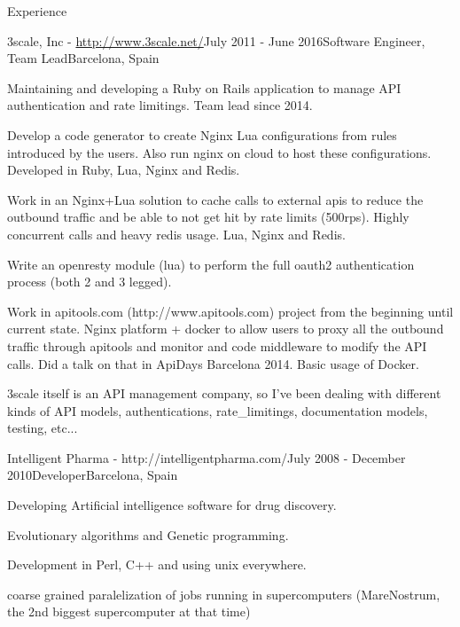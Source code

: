\documentclass{resume} %
\begin{document}
\begin{rSection}{Experience}
\begin{rSubsection}{3scale, Inc - \url{http://www.3scale.net/}}{July 2011 - June 2016}{Software Engineer, Team Lead}{Barcelona, Spain}
\item Maintaining and developing a Ruby on Rails application to manage
  API authentication and rate limitings. Team lead since 2014.
\item Develop a code generator to create Nginx Lua configurations from
  rules introduced by the users. Also run nginx on cloud to host these
  configurations. Developed in Ruby, Lua, Nginx and Redis.
\item Work in an Nginx+Lua solution to cache calls to external apis to
  reduce the outbound traffic and be able to not get hit by rate
  limits (500rps). Highly concurrent calls and heavy redis usage. Lua,
  Nginx and Redis.
\item Write an openresty module (lua) to perform the full oauth2
  authentication process (both 2 and 3 legged).
\item Work in apitools.com (http://www.apitools.com) project from the
  beginning until current state. Nginx platform + docker to allow
  users to proxy all the outbound traffic through apitools and monitor
  and code middleware to modify the API calls. Did a talk on that in
  ApiDays Barcelona 2014. Basic usage of Docker.
\item 3scale itself is an API management company, so I've been dealing
  with different kinds of API models, authentications,
  rate\_limitings, documentation models, testing, etc...
\end{rSubsection}




\begin{rSubsection}{Intelligent Pharma - http://intelligentpharma.com/}{July 2008 - December 2010}{Developer}{Barcelona, Spain}
\item Developing Artificial intelligence software for drug discovery.
\item Evolutionary algorithms and Genetic programming.
\item Development in Perl, C++ and using unix everywhere.
\item coarse grained paralelization of jobs running in supercomputers
  (MareNostrum, the 2nd biggest supercomputer at that time)
\end{rSubsection}



\end{rSection}
\end{document}
